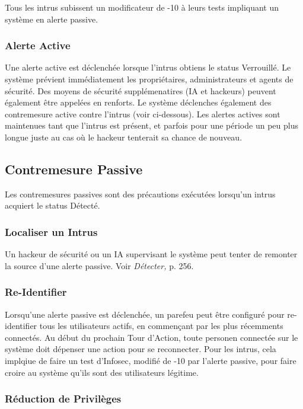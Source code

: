 Tous les intrus subissent un modificateur de -10 à leurs tests impliquant un système en alerte passive. 

\subsubsection{Alerte Active} 

Une alerte active est déclenchée lorsque l'intrus obtiens le status Verrouillé. Le système prévient immédiatement les propriétaires, administrateurs et agents de sécurité. Des moyens de sécurité supplémenatires (IA et hackeurs) peuvent également être appelées en renforts. Le système déclenches également des contremesure active contre l'intrus (voir ci-dessous). Les alertes actives sont maintenues tant que l'intrus est présent, et parfois pour une période un peu plus longue juste au cas où le hackeur tenterait sa chance de nouveau. 

\subsection{Contremesure Passive} 

Les contremesures passives sont des précautions exécutées lorsqu'un intrus acquiert le status Détecté. 

\subsubsection{Localiser un Intrus} 

Un hackeur de sécurité ou un IA supervisant le système peut tenter de remonter la source d'une alerte passive. Voir \textit{Détecter,} p. 256. 

\subsubsection{Re-Identifier} 

Lorsqu'une alerte passive est déclenchée, un parefeu peut être configuré pour re-identifier tous les utilisateurs actifs, en commençant par les plus récemments connectés. Au début du prochain Tour d'Action, toute personen connectée sur le système doit dépenser une action pour se reconnecter. Pour les intrus, cela implqiue de faire un test d'Infosec, modifié de -10 par l'alerte passive, pour faire croire au système qu'ils sont des utilisateurs légitime. 

\subsubsection{Réduction de Privilèges} 

